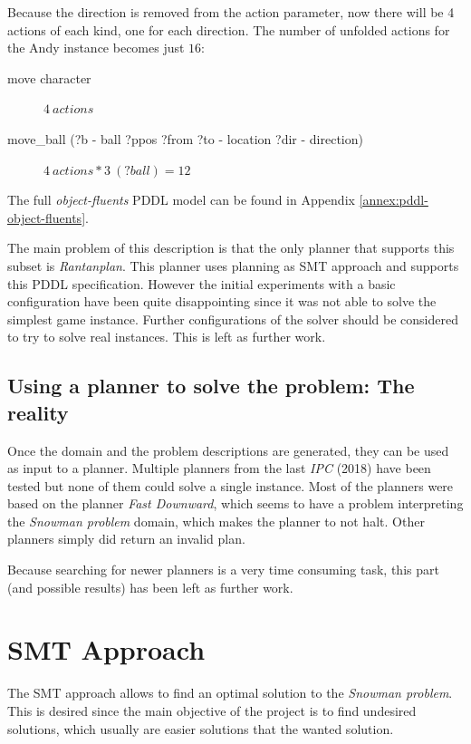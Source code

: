 \documentclass{report}
\theoremstyle{plain}
\begin{document}
\vspace{1\baselineskip}

Because the direction is removed from the action parameter, now there will be 4 actions of each kind, one for each direction. The number of unfolded actions for the Andy instance becomes just $16$:
\begin{description}
    \item[move character] $4\ actions$
    \item[move\_ball (?b - ball ?ppos ?from ?to - location ?dir - direction)] $4\ actions * 3\ (?ball) = 12$
\end{description}

\vspace{1\baselineskip}

The full \emph{object-fluents} PDDL model can be found in Appendix \ref{annex:pddl-object-fluents}.

The main problem of this description is that the only planner that supports this subset is \emph{Rantanplan}\cite{rantanplan}. This planner uses planning as SMT approach and supports this PDDL specification. However the initial experiments with a basic configuration have been quite disappointing since it was not able to solve the simplest game  instance. Further configurations of the solver should be considered to try to solve real instances. This is left as further work.

\subsection{Using a planner to solve the problem: The reality}
Once the domain and the problem descriptions are generated, they can be used as input to a planner. Multiple planners from the last \emph{IPC} (2018) have been tested but none of them could solve a single instance. Most of the planners were based on the planner \emph{Fast Downward}\cite{fastdownward}, which seems to have a problem interpreting the \emph{Snowman problem} domain, which makes the planner to not halt. Other planners simply did return an invalid plan.

Because searching for newer planners is a very time consuming task, this part (and possible results) has been left as further work.

\section{SMT Approach}
The SMT approach allows to find an optimal solution to the \emph{Snowman problem}. This is desired since the main objective of the project is to find undesired solutions, which usually are easier solutions that the wanted solution.
\end{document}
